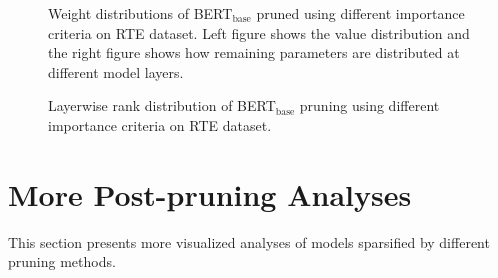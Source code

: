 \begin{figure}[t]
	\centering
	\caption{Weight distributions of BERT$_{\text{base}}$ pruned using different importance criteria on RTE dataset. Left figure shows the value distribution and the right figure shows how remaining parameters are distributed at different model layers.}
	\label{fig:intersim}
\end{figure}
\begin{figure}[t]
	\centering
	\caption{Layerwise rank distribution of BERT$_{\text{base}}$ pruning using different importance criteria on RTE dataset.}
	\label{fig:rank_dist}
\end{figure}

\section{More Post-pruning Analyses}
\label{sec:C}
This section presents more visualized analyses of models sparsified by different pruning methods. 

